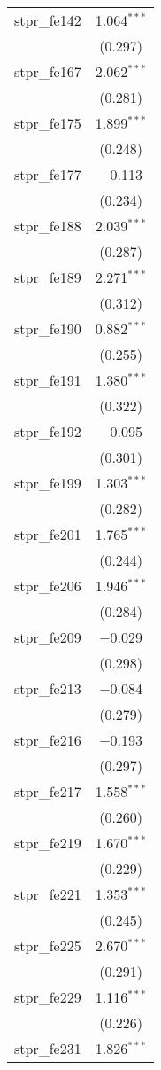 \begin{table}[!htbp]
\begin{tabular}{@{\extracolsep{5pt}}lc}
  stpr\_fe142 & 1.064$^{***}$ \\ 
  & (0.297) \\ 
  stpr\_fe167 & 2.062$^{***}$ \\ 
  & (0.281) \\ 
  stpr\_fe175 & 1.899$^{***}$ \\ 
  & (0.248) \\ 
  stpr\_fe177 & $-$0.113 \\ 
  & (0.234) \\ 
  stpr\_fe188 & 2.039$^{***}$ \\ 
  & (0.287) \\ 
  stpr\_fe189 & 2.271$^{***}$ \\ 
  & (0.312) \\ 
  stpr\_fe190 & 0.882$^{***}$ \\ 
  & (0.255) \\ 
  stpr\_fe191 & 1.380$^{***}$ \\ 
  & (0.322) \\ 
  stpr\_fe192 & $-$0.095 \\ 
  & (0.301) \\ 
  stpr\_fe199 & 1.303$^{***}$ \\ 
  & (0.282) \\ 
  stpr\_fe201 & 1.765$^{***}$ \\ 
  & (0.244) \\ 
  stpr\_fe206 & 1.946$^{***}$ \\ 
  & (0.284) \\ 
  stpr\_fe209 & $-$0.029 \\ 
  & (0.298) \\ 
  stpr\_fe213 & $-$0.084 \\ 
  & (0.279) \\ 
  stpr\_fe216 & $-$0.193 \\ 
  & (0.297) \\ 
  stpr\_fe217 & 1.558$^{***}$ \\ 
  & (0.260) \\ 
  stpr\_fe219 & 1.670$^{***}$ \\ 
  & (0.229) \\ 
  stpr\_fe221 & 1.353$^{***}$ \\ 
  & (0.245) \\ 
  stpr\_fe225 & 2.670$^{***}$ \\ 
  & (0.291) \\ 
  stpr\_fe229 & 1.116$^{***}$ \\ 
  & (0.226) \\ 
  stpr\_fe231 & 1.826$^{***}$ \\ 

\end{tabular}
\end{table}
